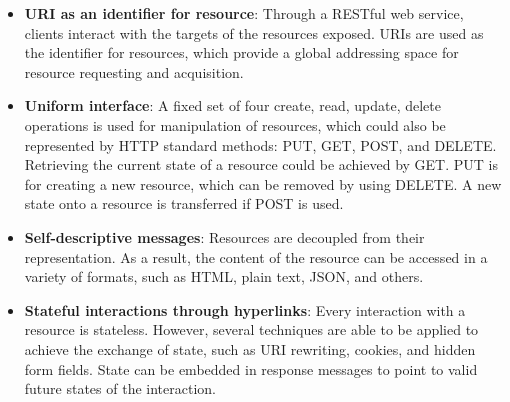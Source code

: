 \begin{itemize}
  \item \textbf{URI as an identifier for resource}:  Through a RESTful web service, clients interact with the targets of the resources exposed. URIs are used as the identifier for resources, which provide a global addressing space for resource requesting and acquisition. 

  \item \textbf{Uniform interface}:  A fixed set of four create, read, update, delete operations is used for manipulation of resources, which could also be represented by HTTP standard methods: PUT, GET, POST, and DELETE.  Retrieving the current state of a resource could be achieved by GET. PUT is for creating a new resource, which can be removed by using DELETE. A new state onto a resource is transferred if POST is used.

  \item \textbf{Self-descriptive messages}:  Resources are decoupled from their representation. As a result, the content of the resource can be accessed in a variety of formats, such as HTML, plain text, JSON, and others.

  \item \textbf{Stateful interactions through hyperlinks}:  Every interaction with a resource is stateless. However, several techniques are able to be applied to achieve the exchange of state, such as URI rewriting, cookies, and hidden form fields. State can be embedded in response messages to point to valid future states of the interaction\cite{tutorial6oracle}. 


\end{itemize}






